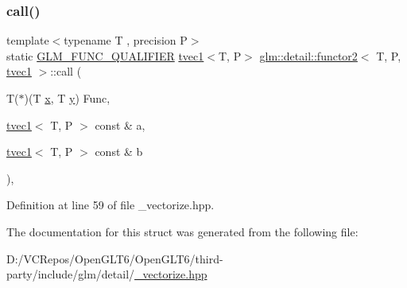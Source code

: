 \subsubsection{\texorpdfstring{call()}{call()}}
{\footnotesize\ttfamily template$<$typename T , precision P$>$ \\
static \mbox{\hyperlink{setup_8hpp_a33fdea6f91c5f834105f7415e2a64407}{G\+L\+M\+\_\+\+F\+U\+N\+C\+\_\+\+Q\+U\+A\+L\+I\+F\+I\+ER}} \mbox{\hyperlink{structglm_1_1tvec1}{tvec1}}$<$T, P$>$ \mbox{\hyperlink{structglm_1_1detail_1_1functor2}{glm\+::detail\+::functor2}}$<$ T, P, \mbox{\hyperlink{structglm_1_1tvec1}{tvec1}} $>$\+::call (\begin{DoxyParamCaption}\item[{T($\ast$)(T \mbox{\hyperlink{glad_8h_a92d0386e5c19fb81ea88c9f99644ab1d}{x}}, T \mbox{\hyperlink{glad_8h_a66ddd433d2cacfe27f5906b7e86faeed}{y}})}]{Func,  }\item[{\mbox{\hyperlink{structglm_1_1tvec1}{tvec1}}$<$ T, P $>$ const \&}]{a,  }\item[{\mbox{\hyperlink{structglm_1_1tvec1}{tvec1}}$<$ T, P $>$ const \&}]{b }\end{DoxyParamCaption})\hspace{0.3cm}{\ttfamily [inline]}, {\ttfamily [static]}}



Definition at line 59 of file \+\_\+vectorize.\+hpp.



The documentation for this struct was generated from the following file\+:\begin{DoxyCompactItemize}
\item 
D\+:/\+V\+C\+Repos/\+Open\+G\+L\+T6/\+Open\+G\+L\+T6/third-\/party/include/glm/detail/\mbox{\hyperlink{__vectorize_8hpp}{\+\_\+vectorize.\+hpp}}\end{DoxyCompactItemize}

